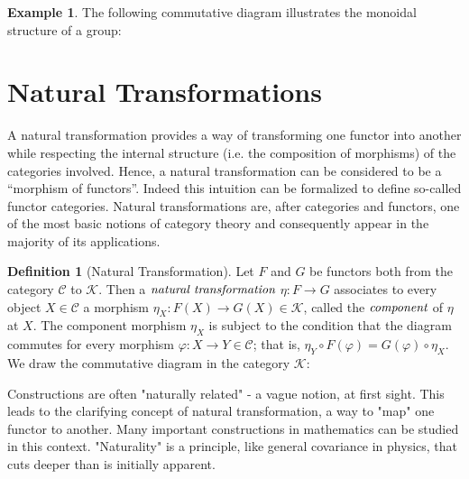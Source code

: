 \documentclass[10pt, oneside, reqno]{amsart}
\theoremstyle{plain}%
\theoremstyle{definition}
\newtheorem{defn}[thm]{Definition}
\newtheorem{exmp}[thm]{Example}
\theoremstyle{remark}
\newcommand{\Id}{\mathit{id}_}
\begin{document}
\begin{exmp}
 The following commutative diagram illustrates the monoidal structure of a group:
 \monoid{
  (A\otimes A)\otimes A\otimes A &
  A\otimes (A\otimes A) &
  A\otimes A &
  A\otimes A &
  A &
  \mu\otimes \Id{} &
  \Id{} \otimes\mu &
  \mu &
  \mu\otimes \Id{}
 }
\end{exmp}


\section{Natural Transformations} %
\label{sec:natural transformations}
A natural transformation provides a way of transforming one functor into another
while respecting the internal structure (i.e. the composition of morphisms) of the categories involved.
Hence, a natural transformation can be considered to be a ``morphism of functors''.
Indeed this intuition can be formalized to define so-called functor categories.
Natural transformations are, after categories and functors, one of the most basic notions of category theory and consequently
appear in the majority of its applications.

\begin{defn}[Natural Transformation]
 Let $F$ and $G$ be functors both from the category $\mathcal{C}$ to $\mathcal{K}$.
 Then a $\emph{natural transformation}$ $\eta : F \to G$ associates to every object
 $X \in \mathcal{C}$ a morphism $\eta_{X} : F(X) \to G(X) \in \mathcal{K}$, called the $\emph{component}$
 of $\eta$ at $X$. The component morphism $\eta_{X}$ is subject to the condition that the diagram
 commutes for every morphism $\varphi: X \to Y \in \mathcal{C}$; that is,
 $\eta_{Y} \circ F(\varphi) = G(\varphi) \circ \eta_{X}$.
 \\
 We draw the commutative diagram in the category $\mathcal{K}$:
\end{defn}
Constructions are often "naturally related" - a vague notion, at first sight.
This leads to the clarifying concept of natural transformation, a way to "map" one functor to another.
Many important constructions in mathematics can be studied in this context.
"Naturality" is a principle, like general covariance in physics, that cuts deeper than is initially apparent.
\end{document}

